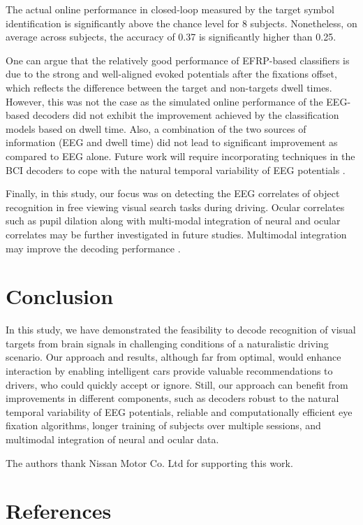 \documentclass[12pt]{iopart}
\begin{document}
The actual online performance in closed-loop measured by the target symbol identification
is significantly above the chance level for 8 subjects.
Nonetheless, on average across subjects, the accuracy of 0.37 is 
significantly higher than 0.25.

One can argue that the relatively good performance of EFRP-based classifiers is
due to the strong and well-aligned evoked potentials after the fixations offset,
which reflects the difference between the target and non-targets dwell times.
However, this was not the case as the simulated online
performance of the EEG-based decoders did not exhibit 
the improvement achieved by the classification models based on
dwell time. Also, a combination of the two sources of 
information (EEG and dwell time) did not lead to significant
improvement as compared to EEG alone. Future work will require 
incorporating techniques in the BCI decoders to cope
with the natural temporal variability of EEG potentials 
\cite{aydarkhanov_spatial_2020}.

Finally, in this study, our focus was on detecting the EEG correlates of object recognition in free viewing visual search tasks during driving. Ocular correlates such as pupil dilation along with multi-modal
integration of neural and ocular correlates may be further investigated
in future studies.
Multimodal integration may improve the decoding performance \cite{jangraw_neurally_2014}.


\section{Conclusion}
\label{sec:conclusion}

In this study, we have demonstrated the feasibility to decode 
recognition of visual targets from brain signals in
challenging conditions of a naturalistic driving scenario.
Our approach and results, although far from optimal, would
enhance interaction by enabling intelligent cars provide 
valuable recommendations to drivers, who could quickly accept
or ignore. Still, our approach can benefit from improvements
in different components, such as decoders robust to the
natural temporal variability of EEG potentials, reliable
and computationally efficient eye fixation algorithms, longer
training of subjects over multiple sessions, and multimodal 
integration of neural and ocular data.

\ack

The authors thank Nissan Motor Co. Ltd for supporting
this work.

\section*{References}



\end{document}
